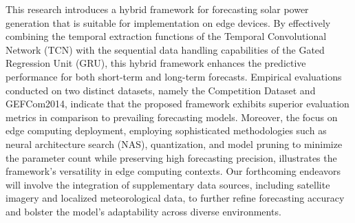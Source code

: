 \documentclass[sn-mathphys-num]{sn-jnl}%
\begin{document}
This research introduces a hybrid framework for forecasting solar power generation that is suitable for implementation on edge devices. By effectively combining the temporal extraction functions of the Temporal Convolutional Network (TCN) with the sequential data handling capabilities of the Gated Regression Unit (GRU), this hybrid framework enhances the predictive performance for both short-term and long-term forecasts. Empirical evaluations conducted on two distinct datasets, namely the Competition Dataset and GEFCom2014, indicate that the proposed framework exhibits superior evaluation metrics in comparison to prevailing forecasting models. Moreover, the focus on edge computing deployment, employing sophisticated methodologies such as neural architecture search (NAS), quantization, and model pruning to minimize the parameter count while preserving high forecasting precision, illustrates the framework's versatility in edge computing contexts. Our forthcoming endeavors will involve the integration of supplementary data sources, including satellite imagery and localized meteorological data, to further refine forecasting accuracy and bolster the model’s adaptability across diverse environments.





%

%





\end{document}
